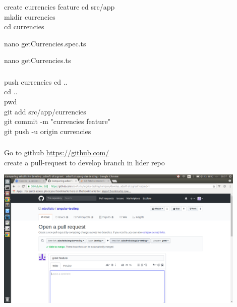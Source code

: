 \documentclass{beamer}
\begin{document}
\begin{frame}\frametitle{} 

\begin{block}{create currencies feature}
cd src/app \\
mkdir currencies \\
cd currencies
\end{block}

\begin{block}{nano getCurrencies.spec.ts}
\lstspec
\end{block}

\begin{block}{nano getCurrencies.ts}
\lstts
\end{block}

\end{frame}




\begin{frame}\frametitle{} 


\begin{block}{push currencies}
cd .. \\
cd .. \\
pwd  \\
git add src/app/currencies \\
git commit -m "currencies feature" \\
git push -u origin currencies \\
\end{block}

\end{frame}


\begin{frame}\frametitle{} 

\begin{block}{Go to github}
\url{https://github.com/} \\

create a pull-request to develop branch in lider repo
\end{block}

\begin{center}
\includegraphics[width=0.9\textwidth]{pull-request.png}
\end{center}


\end{frame}
\end{document}
